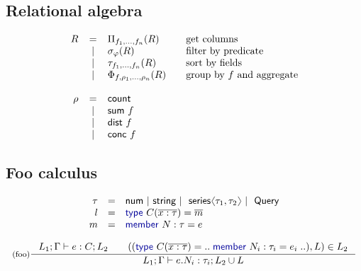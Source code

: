 \documentclass[a4paper,UKenglish]{lipics-v2016}
\newcommand{\langl}{\begin{picture}(4.5,7)
\put(1.1,2.5){\rotatebox{60}{\line(1,0){5.5}}}
\put(1.1,2.5){\rotatebox{300}{\line(1,0){5.5}}}
\end{picture}}
\newcommand{\rangl}{\begin{picture}(4.5,7)
\put(.9,2.5){\rotatebox{120}{\line(1,0){5.5}}}
\put(.9,2.5){\rotatebox{240}{\line(1,0){5.5}}}
\end{picture}}
\newcommand{\lsep}{~|~}
\newcommand{\kvd}[1]{\textnormal{\textcolor{kvdclr}{\sffamily #1}}}
\newcommand{\ident}[1]{\textnormal{\sffamily #1}}
\begin{document}
\subsection{Relational algebra}
\begin{equation*}
\begin{array}{rclll}
  R & = & \Pi_{f_1, \ldots, f_n} (R) &&\textnormal{get columns}\\
   & \lsep & \sigma_\varphi (R) &&\textnormal{filter by predicate}\\
   & \lsep & \tau_{f_1, \ldots, f_n}(R) &&\textnormal{sort by fields}\\
   & \lsep & \Phi_{f, \rho_1, \ldots, \rho_n} (R) &&\textnormal{group by $f$ and aggregate}\\
   \\
  \rho & = & \ident{count}  \\
   & \lsep & \ident{sum}~f    \\       
   & \lsep & \ident{dist}~f\\
   & \lsep & \ident{conc}~f\\
\end{array}
\end{equation*}
\subsection{Foo calculus}
\begin{equation*}
\begin{array}{rcl}
 \tau &=& \ident{num} \lsep \ident{string} \lsep \ident{series}\langl \tau_1, \tau_2 \rangl \lsep \ident{Query}\\
 l &=& \kvd{type}~C(\overline{x:\tau}) = \overline{m} \\[0.0em]
 m &=& \kvd{member}~N:\tau= e
\end{array}
\end{equation*}



\begin{equation*}
\inference[(foo)]
  {L_1; \Gamma \vdash e : C; L_2 \qquad ((\kvd{type}~C(\overline{x:\tau}) = ..\;\kvd{member}~N_i : \tau_i = e_i\;..), L) \in L_2}
  {L_1; \Gamma \vdash e.N_i:\tau_i; L_2 \cup L}
\end{equation*}

\newpage
\end{document}
